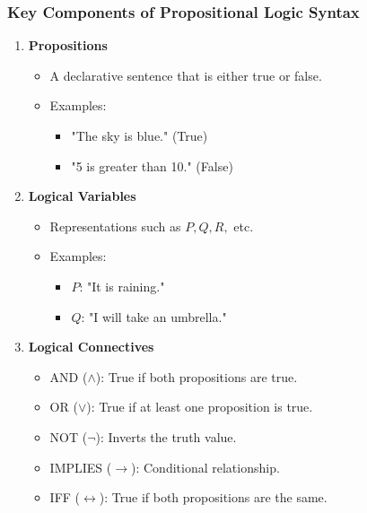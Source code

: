 \documentclass[aspectratio=169]{beamer}
\begin{document}
\begin{frame}[fragile]
    \frametitle{Key Components of Propositional Logic Syntax}
    \begin{enumerate}
        \item \textbf{Propositions}
        \begin{itemize}
            \item A declarative sentence that is either true or false.
            \item Examples:
                \begin{itemize}
                    \item "The sky is blue." (True)
                    \item "5 is greater than 10." (False)
                \end{itemize}
        \end{itemize}
        
        \item \textbf{Logical Variables}
        \begin{itemize}
            \item Representations such as \( P, Q, R, \) etc.
            \item Examples:
                \begin{itemize}
                    \item \( P \): "It is raining."
                    \item \( Q \): "I will take an umbrella."
                \end{itemize}
        \end{itemize}
        
        \item \textbf{Logical Connectives}
        \begin{itemize}
            \item AND (\(\land\)): True if both propositions are true.
            \item OR (\(\lor\)): True if at least one proposition is true.
            \item NOT (\(\neg\)): Inverts the truth value.
            \item IMPLIES (\(\rightarrow\)): Conditional relationship.
            \item IFF (\(\leftrightarrow\)): True if both propositions are the same.
        \end{itemize}
    \end{enumerate}
\end{frame}
\end{document}
